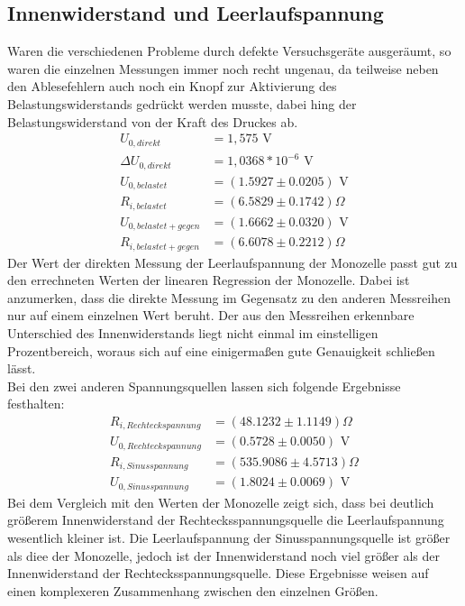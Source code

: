 \subsection{Innenwiderstand und Leerlaufspannung}
Waren die verschiedenen Probleme durch defekte Versuchsgeräte ausgeräumt, so waren die einzelnen
Messungen immer noch recht ungenau, da teilweise neben den Ablesefehlern auch noch ein Knopf zur Aktivierung des
Belastungswiderstands gedrückt werden musste, dabei hing der Belastungswiderstand von der Kraft des Druckes ab.
\begin{align}
U_{0,direkt}&=1,575 \text{ V} \\
\Delta U_{0,direkt}&=1,0368*10^{-6}\text{ V}\\
U_{0,belastet}&=(1.5927\pm 0.0205)\text{ V}\\
R_{i,belastet}&=(6.5829\pm 0.1742)\Omega\\
U_{0,belastet + gegen}&=(1.6662\pm 0.0320)\text{ V}\\
R_{i,belastet + gegen}&=(6.6078\pm 0.2212)\Omega
\end{align}
Der Wert der direkten Messung der Leerlaufspannung der Monozelle 
passt gut zu den errechneten Werten der linearen Regression der Monozelle. Dabei ist anzumerken, dass die direkte Messung
im Gegensatz zu den anderen Messreihen nur auf einem einzelnen Wert beruht. Der aus den Messreihen erkennbare Unterschied des Innenwiderstands liegt nicht einmal im einstelligen Prozentbereich, woraus sich auf eine einigermaßen gute Genauigkeit schließen lässt.\\
Bei den zwei anderen Spannungsquellen lassen sich folgende Ergebnisse festhalten:
\begin{align}
R_{i,Rechteckspannung}&=(48.1232\pm 1.1149)\Omega\\
U_{0,Rechteckspannung}&=(0.5728\pm 0.0050)\text{ V}\\
R_{i,Sinusspannung}&=(535.9086\pm 4.5713)\Omega\\
U_{0,Sinusspannung}&=(1.8024\pm 0.0069)\text{ V}
\end{align}
Bei dem Vergleich mit den Werten der Monozelle zeigt sich, dass bei deutlich größerem Innenwiderstand der
Rechtecksspannungsquelle die Leerlaufspannung wesentlich kleiner ist. Die Leerlaufspannung der
Sinusspannungsquelle ist größer als diee der Monozelle, jedoch ist der Innenwiderstand noch viel
größer als der Innenwiderstand der Rechtecksspannungsquelle. Diese Ergebnisse weisen auf einen 
komplexeren Zusammenhang zwischen den einzelnen Größen.
